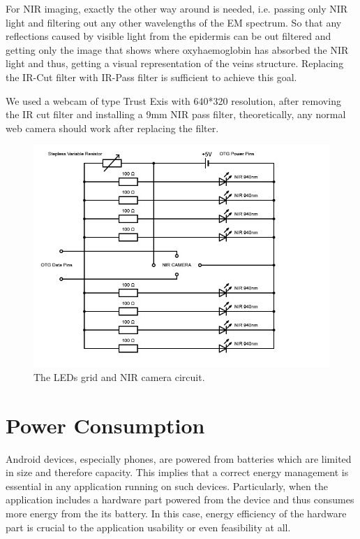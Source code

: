 For NIR imaging, exactly the other way around is needed, i.e. passing only NIR light and filtering out any other wavelengths of the EM spectrum. So that any reflections caused by visible light from the epidermis can be out filtered and getting only the image that shows where oxyhaemoglobin has absorbed the NIR light and thus, getting a visual representation of the veins structure. Replacing the IR-Cut filter with IR-Pass filter is sufficient to achieve this goal.

We used a  webcam of type Trust Exis with 640*320 resolution, after removing the IR cut filter and installing a 9mm NIR pass filter, theoretically, any normal web camera should work after replacing the filter.

\begin{figure}[H]
\centering
\includegraphics{figures/circuit.jpg}
\caption{The LEDs grid and NIR camera circuit.}\label{fig:circuit}
\end{figure}


\section{Power Consumption}
Android devices, especially phones, are powered from batteries which are limited in size and therefore capacity. This implies that a correct energy management is essential in any application running on such devices. Particularly, when the application includes a hardware part powered from the device and thus consumes more energy from the its battery. In this case, energy efficiency of the hardware part is crucial to the application usability or even feasibility at all.

